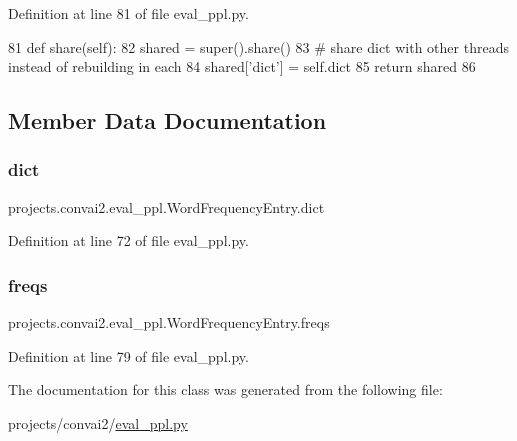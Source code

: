 Definition at line 81 of file eval\+\_\+ppl.\+py.


\begin{DoxyCode}
81     \textcolor{keyword}{def }share(self):
82         shared = super().share()
83         \textcolor{comment}{# share dict with other threads instead of rebuilding in each}
84         shared[\textcolor{stringliteral}{'dict'}] = self.dict
85         \textcolor{keywordflow}{return} shared
86 
\end{DoxyCode}


\subsection{Member Data Documentation}
\mbox{\label{classprojects_1_1convai2_1_1eval__ppl_1_1WordFrequencyEntry_af518e0d344e66f8ec7eede1bb6359e7e}} 
\subsubsection{\texorpdfstring{dict}{dict}}
{\footnotesize\ttfamily projects.\+convai2.\+eval\+\_\+ppl.\+Word\+Frequency\+Entry.\+dict}



Definition at line 72 of file eval\+\_\+ppl.\+py.

\mbox{\label{classprojects_1_1convai2_1_1eval__ppl_1_1WordFrequencyEntry_a63fd68257eda4fc1560e4b58f858312c}} 
\subsubsection{\texorpdfstring{freqs}{freqs}}
{\footnotesize\ttfamily projects.\+convai2.\+eval\+\_\+ppl.\+Word\+Frequency\+Entry.\+freqs}



Definition at line 79 of file eval\+\_\+ppl.\+py.



The documentation for this class was generated from the following file\+:\begin{DoxyCompactItemize}
\item 
projects/convai2/\hyperlink{projects_2convai2_2eval__ppl_8py}{eval\+\_\+ppl.\+py}\end{DoxyCompactItemize}

